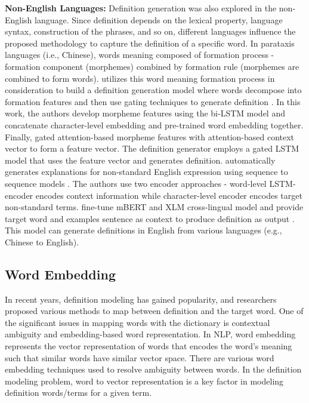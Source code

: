 \textbf{Non-English Languages:} Definition generation was also explored in the non-English language. Since definition depends on the lexical property, language syntax, construction of the phrases, and so on, different languages influence the proposed methodology to capture the definition of a specific word. In parataxis languages (i.e., Chinese), words meaning composed of formation process - formation component (morphemes) combined by formation rule (morphemes are combined to form words). \citeauthor*{zheng_decompose_2021} utilizes this word meaning formation process in consideration to build a definition generation model where words decompose into formation features and then use gating techniques to generate definition \cite{zheng_decompose_2021}. In this work, the authors develop morpheme features using the bi-LSTM model and concatenate character-level embedding and pre-trained word embedding together. Finally, gated attention-based morpheme features with attention-based context vector to form a feature vector. The definition generator employs a gated LSTM model that uses the feature vector and generates definition. \citeauthor*{ni_learning_2017} automatically generates explanations for non-standard English expression using sequence to sequence models \cite{ni_learning_2017}. The authors use two encoder approaches - word-level LSTM-encoder encodes context information while character-level encoder encodes target non-standard terms. \citeauthor*{kong_toward_2020} fine-tune mBERT and XLM cross-lingual model and provide target word and examples sentence as context to produce definition as output \cite{kong_toward_2020}. This model can generate definitions in English from various languages (e.g., Chinese to English). 


\subsection{Word Embedding}
In recent years, definition modeling has gained popularity, and researchers proposed various methods to map between definition and the target word. One of the significant issues in mapping words with the dictionary is contextual ambiguity and embedding-based word representation. In NLP, word embedding represents the vector representation of words that encodes the word's meaning such that similar words have similar vector space. There are various word embedding techniques used to resolve ambiguity between words. In the definition modeling problem, word to vector representation is a key factor in modeling definition words/terms for a given term. 

